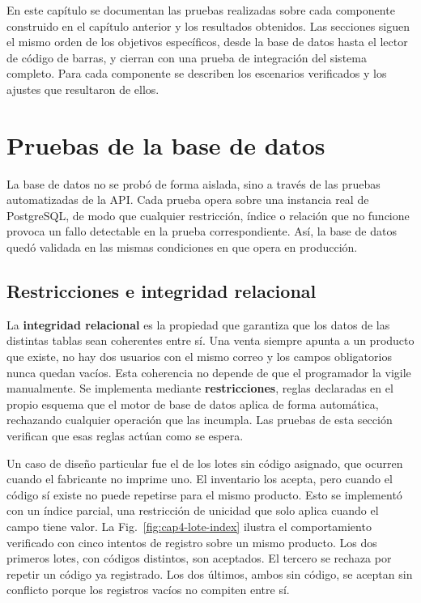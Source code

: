 
\clearpage
{}

En este capítulo se documentan las pruebas realizadas sobre cada componente construido en el capítulo anterior y los resultados obtenidos. Las secciones siguen el mismo orden de los objetivos específicos, desde la base de datos hasta el lector de código de barras, y cierran con una prueba de integración del sistema completo. Para cada componente se describen los escenarios verificados y los ajustes que resultaron de ellos.


\section{Pruebas de la base de datos}

La base de datos no se probó de forma aislada, sino a través de las pruebas automatizadas de la API. Cada prueba opera sobre una instancia real de PostgreSQL, de modo que cualquier restricción, índice o relación que no funcione provoca un fallo detectable en la prueba correspondiente. Así, la base de datos quedó validada en las mismas condiciones en que opera en producción.

\subsection{Restricciones e integridad relacional}

La \textbf{integridad relacional} es la propiedad que garantiza que los datos de las distintas tablas sean coherentes entre sí. Una venta siempre apunta a un producto que existe, no hay dos usuarios con el mismo correo y los campos obligatorios nunca quedan vacíos. Esta coherencia no depende de que el programador la vigile manualmente. Se implementa mediante \textbf{restricciones}, reglas declaradas en el propio esquema que el motor de base de datos aplica de forma automática, rechazando cualquier operación que las incumpla. Las pruebas de esta sección verifican que esas reglas actúan como se espera.

Un caso de diseño particular fue el de los lotes sin código asignado, que ocurren cuando el fabricante no imprime uno. El inventario los acepta, pero cuando el código sí existe no puede repetirse para el mismo producto. Esto se implementó con un índice parcial, una restricción de unicidad que solo aplica cuando el campo tiene valor. La Fig.~\ref{fig:cap4-lote-index} ilustra el comportamiento verificado con cinco intentos de registro sobre un mismo producto. Los dos primeros lotes, con códigos distintos, son aceptados. El tercero se rechaza por repetir un código ya registrado. Los dos últimos, ambos sin código, se aceptan sin conflicto porque los registros vacíos no compiten entre sí.


